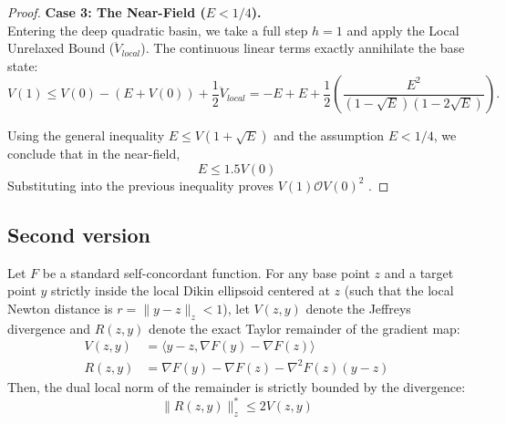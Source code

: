 \begin{proof}
\textbf{Case 3: The Near-Field ($E < 1/4$).} \\
Entering the deep quadratic basin, we take a full step $h = 1$ and apply the Local Unrelaxed Bound ($\ddot{V}_{local}$). The continuous linear terms exactly annihilate the base state:
\begin{equation}
    V(1) \le V(0) - (E + V(0)) + \frac{1}{2}\ddot{V}_{local} = -E + E + \frac{1}{2}\left( \frac{E^2}{(1-\sqrt{E})(1-2\sqrt{E})} \right).
\end{equation}

Using the general inequality $E \le V(1 + \sqrt{E})$ and the
assumption $E < 1/4$, we conclude that in the near-field,
\begin{equation}
 E \le 1.5 V(0)
\end{equation}
Substituting into the previous inequality proves $V(1) \mathcal{O} V(0)^2$ .
\end{proof}






\subsection{Second version}




\begin{lemma}
\label{lemma:coupled_integral}
Let $F$ be a standard self-concordant function. For any base point $z$ and a target point $y$ strictly inside the local Dikin ellipsoid centered at $z$ (such that the local Newton distance is $r = \|y - z\|_z < 1$), let $V(z, y)$ denote the Jeffreys divergence and $R(z, y)$ denote the exact Taylor remainder of the gradient map:
\begin{align}
    V(z, y) &= \langle y - z, \nabla F(y) - \nabla F(z) \rangle \\
    R(z, y) &= \nabla F(y) - \nabla F(z) - \nabla^2 F(z)(y - z)
\end{align}
Then, the dual local norm of the remainder is strictly bounded by the divergence:
\begin{equation}
    \|R(z, y)\|^*_z \le 2 V(z, y)
\end{equation}
\end{lemma}


